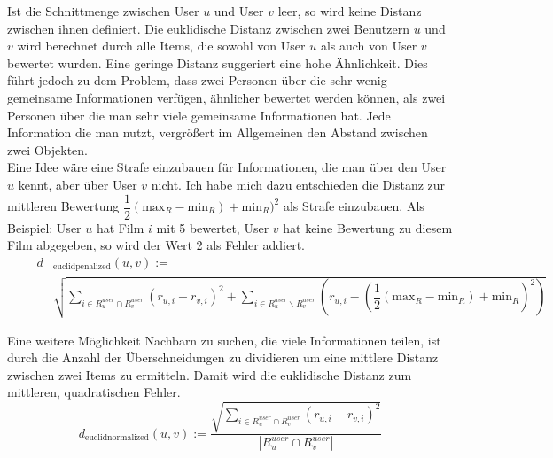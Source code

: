 Ist die Schnittmenge zwischen User $u$ und User $v$ leer, so wird keine Distanz zwischen ihnen definiert.
Die euklidische Distanz zwischen zwei Benutzern $u$ und $v$ wird berechnet durch alle Items, die sowohl von User $u$ als auch von User $v$ bewertet wurden. Eine geringe Distanz suggeriert eine hohe Ähnlichkeit. Dies führt jedoch zu dem Problem, dass zwei Personen über die sehr wenig gemeinsame Informationen verfügen, ähnlicher bewertet werden können, als zwei Personen über die man sehr viele gemeinsame Informationen hat. Jede Information die man nutzt, vergrößert im Allgemeinen den Abstand zwischen zwei Objekten.\\
Eine Idee wäre eine Strafe einzubauen für Informationen, die man über den User $u$ kennt, aber über User $v$ nicht.
Ich habe mich dazu entschieden die Distanz zur mittleren Bewertung $\dfrac{1}{2}(\mathrm{max}_{R}-\mathrm{min}_{R})+\mathrm{min}_{R})^2$ als Strafe einzubauen. Als Beispiel: User $u$ hat Film $i$ mit 5 bewertet, User $v$ hat keine Bewertung zu diesem Film abgegeben, so wird der Wert 2 als Fehler addiert.
\begin{equation}
\begin{aligned}
\qquad	d&_{\mathrm{euclidpenalized}}(u,v) := \\ &\sqrt{\sum\limits_{i \in R^{user}_{u}\cap R^{user}_{v}} (r_{u,i}-r_{v,i})^2  + \sum\limits_{i \in R^{user}_{u}\backslash R^{user}_{v}} (r_{u,i}-(\dfrac{1}{2}(\mathrm{max}_{R}-\mathrm{min}_{R})+\mathrm{min}_{R})^2) }
	\label{euclidpenalty}
\end{aligned}
\end{equation}

Eine weitere Möglichkeit Nachbarn zu suchen, die viele Informationen teilen, ist durch die Anzahl der Überschneidungen zu dividieren um eine mittlere Distanz zwischen zwei Items zu ermitteln. Damit wird die euklidische Distanz zum mittleren, quadratischen Fehler.
\begin{equation}
d_{\mathrm{euclidnormalized}}(u,v) := \dfrac{\sqrt{\sum\limits_{i \in R^{user}_{u}\cap R^{user}_{v}} (r_{u,i}-r_{v,i})^2  }}{|R^{user}_{u}\cap R^{user}_{v}|}
\label{euclidmean}
\end{equation}

